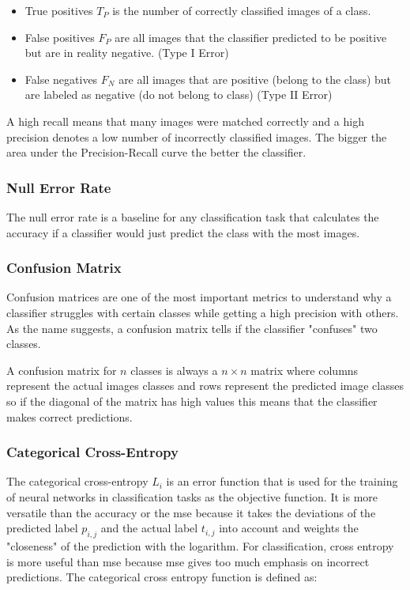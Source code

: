 \begin{itemize}
	\item True positives $T_P$ is the number of correctly classified images of a class.
	\item False positives $F_P$ are all images that the classifier predicted to be positive but are in reality negative. {(Type I Error)}
	\item False negatives $F_N$ are all images that are positive {(belong to the class)} but are labeled as negative {(do not belong to class)} {(Type II Error)}
\end{itemize}

A high recall means that many images were matched correctly and a high precision denotes a low number of incorrectly classified images. The bigger the area under the Precision-Recall curve the better the classifier.

\subsubsection*{Null Error Rate}
The null error rate is a baseline for any classification task that calculates the accuracy if a classifier would just predict the class with the most images.

\subsubsection*{Confusion Matrix}
Confusion matrices are one of the most important metrics to understand why a classifier struggles with certain classes while getting a high precision with others. As the name suggests, a confusion matrix tells if the classifier "confuses" two classes.

A confusion matrix for $n$ classes is always a $n \times n$ matrix where columns represent the actual images classes and rows represent the predicted image classes so if the diagonal of the matrix has high values this means that the classifier makes correct predictions.

\subsubsection*{Categorical Cross-Entropy}
The categorical cross-entropy $L_i$ is an error function that is used for the training of neural networks in classification tasks as the objective function. It is more versatile than the accuracy or the \gls{mse} because it takes the deviations of the predicted label $p_{i,j}$ and the actual label $t_{i,j}$ into account and weights the "closeness" of the prediction with the logarithm. For classification, cross entropy is more useful than \gls{mse} because \gls{mse} gives too much emphasis on incorrect predictions. The categorical cross entropy function is defined as:

